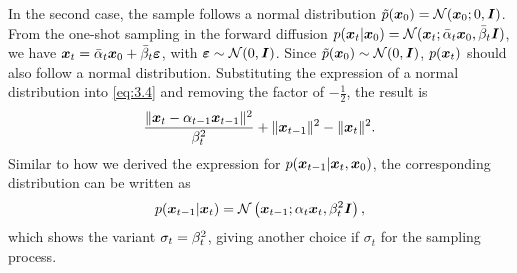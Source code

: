 In the second case, the sample follows a normal distribution $\tilde{p}(\bm{x}_0)=\mathcal{N}(\bm{x}_0;0,\bm{I})$. From the one-shot sampling in the forward diffusion $p(\bm{x}_{t}|\bm{x}_0)=\mathcal{N}(\bm{x}_{t};\bar{\alpha}_t\bm{x}_0,\bar{\beta}_t\bm{I})$, we have $\bm{x}_{t}=\bar{\alpha}_t \bm{x}_0+\bar{\beta}_t\bm{\varepsilon}$, with $\bm{\varepsilon}\sim\mathcal{N}(0,\bm{I})$. Since $\tilde{p}(\bm{x}_0)\sim\mathcal{N}(0,\bm{I})$, $p(\bm{x}_{t})$ should also follow a normal distribution. Substituting the expression of a normal distribution into \cref{eq:3.4} and removing the factor of $-\frac{1}{2}$, the result is
\begin{equation}
    \label{eq:1.17}
    \frac{\|\bm{x}_{t}-\alpha_{t-1}\bm{x}_{t-1}\|^2}{\beta_t^2}+\|\bm{x}_{t-1}\|^2-\|\bm{x}_{t}\|^2.
\end{equation}
Similar to how we derived the expression for $p(\bm{x}_{t-1}|\bm{x}_{t},\bm{x}_0)$, the corresponding distribution can be written as 
\begin{equation}
    \label{eq:1.18}
    p(\bm{x}_{t-1}|\bm{x}_{t})=\mathcal{N}\left( \bm{x}_{t-1};\alpha_t\bm{x}_{t},\beta_t^2\bm{I} \right),
\end{equation}
which shows the variant $\sigma_t=\beta_t^2$, giving another choice if $\sigma_t$ for the sampling process.